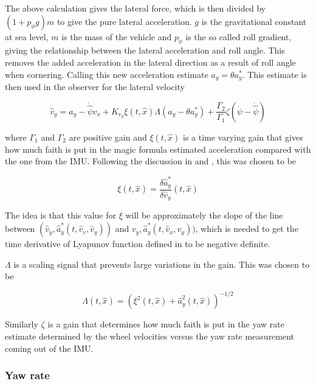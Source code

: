 The above calculation gives the lateral force, which is then divided by $(1 + p_{\phi}g)m$ to give the pure lateral acceleration. $g$ is the gravitational constant at sea level, $m$ is the mass of the vehicle and $p_{\phi}$ is the so called roll gradient, giving the relationship between the lateral acceleration and roll angle. This removes the added acceleration in the lateral direction as a result of roll angle when cornering. Calling this new acceleration estimate $a_y = \theta a_y^*$. This estimate is then used in the observer for the lateral velocity

\begin{equation}
    \dot{\hat{v}}_y = a_y - \dot{\hat{\psi}}\hat{v}_x + K_{v_y}\xi(t,\hat{x})\Lambda(a_y - \theta a_y^{*}) + \frac{\Gamma_2}{\Gamma_1}\zeta(\dot{\psi} - \dot{\hat{\psi}})
\end{equation}

where $\Gamma_1$ and $\Gamma_2$ are positive gain and $\xi(t,\hat{x})$ is a time varying gain that gives how much faith is put in the magic formula estimated acceleration compared with the one from the \gls{IMU}. Following the discussion in \cite{MainStateEst} and \cite{FossenGrip2007}, this was chosen to be

\begin{equation}
    \xi(t,\hat{x}) = \frac{\delta \hat{a}_y^*}{\delta \hat{v}_y}(t,\hat{x})
\end{equation}

The idea is that this value for $\xi$ will be approximately the slope of the line between $(\hat{v}_y,\hat{a}_y^*(t,\hat{v}_v,\hat{v}_y))$ and $v_y,\hat{a}_y^*(t,\hat{v}_x,v_y))$, which is needed to get the time derivative of Lyapunov function defined in \cite{FossenGrip2007} to be negative definite.

$\Lambda$ is a scaling signal that prevents large variations in the gain. This was chosen to be

\begin{equation}
    \Lambda(t,\hat{x}) = (\xi^2(t,\hat{x}) + \hat{a}_y^2(t,\hat{x}))^{-1/2}
\end{equation}

Similarly $\zeta$ is a gain that determines how much faith is put in the yaw rate estimate determined by the wheel velocities versus the yaw rate measurement coming out of the IMU.

\subsubsection{Yaw rate}

